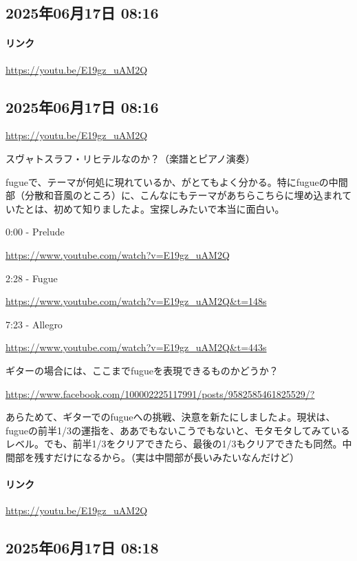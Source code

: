 \subsection*{2025年06月17日 08:16}

\paragraph{リンク}
\url{https://youtu.be/E19gz_uAM2Q}

\subsection*{2025年06月17日 08:16}

\url{https://youtu.be/E19gz_uAM2Q}

スヴャトスラフ・リヒテルなのか？（楽譜とピアノ演奏）

fugueで、テーマが何処に現れているか、がとてもよく分かる。特にfugueの中間部（分散和音風のところ）に、こんなにもテーマがあちらこちらに埋め込まれていたとは、初めて知りましたよ。宝探しみたいで本当に面白い。

0:00 - Prelude

\url{https://www.youtube.com/watch?v=E19gz_uAM2Q}

2:28 - Fugue

\url{https://www.youtube.com/watch?v=E19gz_uAM2Q&t=148s}

7:23 - Allegro

\url{https://www.youtube.com/watch?v=E19gz_uAM2Q&t=443s}

ギターの場合には、ここまでfugueを表現できるものかどうか？

\url{https://www.facebook.com/100002225117991/posts/9582585461825529/?}

あらためて、ギターでのfugueへの挑戦、決意を新たにしましたよ。現状は、fugueの前半1/3の運指を、ああでもないこうでもないと、モタモタしてみているレベル。でも、前半1/3をクリアできたら、最後の1/3もクリアできたも同然。中間部を残すだけになるから。（実は中間部が長いみたいなんだけど）

\paragraph{リンク}
\url{https://youtu.be/E19gz_uAM2Q}

\subsection*{2025年06月17日 08:18}

